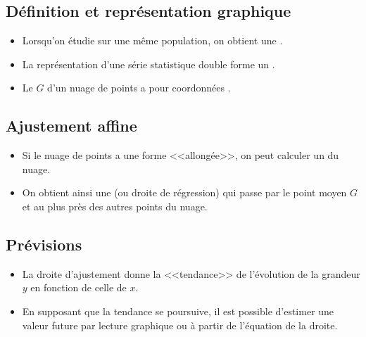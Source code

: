 \documentclass[12pt,a4paper]{article}
\begin{document}
\subsection{Définition et représentation graphique}

\begin{mybilan}
	\begin{itemize}
		\item Lorsqu'on étudie  sur une même population, on obtient une .
		
		\item La représentation d'une série statistique double forme un .
		
		\item Le  $G$ d'un  nuage de points a pour coordonnées .
	\end{itemize}
	

\end{mybilan}

	
	
	
\subsection{Ajustement affine}

\begin{mybilan}
	\begin{itemize}
		\item Si le nuage de points a une forme <<allongée>>, on peut calculer un  du nuage. 
		\item On obtient ainsi une  (ou droite de régression) qui passe par le point moyen $G$ et au plus près des autres points du nuage.		
	\end{itemize}
\end{mybilan}




\subsection{Prévisions}

\begin{mymeth}
	\begin{itemize}
		\item La droite d'ajustement donne la <<tendance>> de l'évolution de la grandeur $y$ en fonction de celle de $x$.
		\item En supposant que la tendance se poursuive, il est possible d'estimer une valeur future par lecture graphique ou à partir de l'équation de la droite. 
	\end{itemize}
	
	
\end{mymeth}


\end{document}
